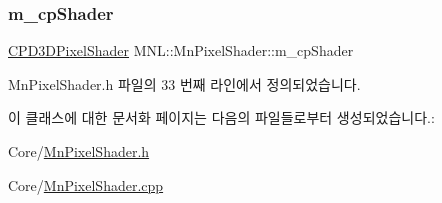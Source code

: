 \subsubsection{\texorpdfstring{m\+\_\+cp\+Shader}{m\_cpShader}}
{\footnotesize\ttfamily \hyperlink{namespace_m_n_l_a4d6bd408e6e19137a03728583296f12a}{C\+P\+D3\+D\+Pixel\+Shader} M\+N\+L\+::\+Mn\+Pixel\+Shader\+::m\+\_\+cp\+Shader\hspace{0.3cm}{\ttfamily [private]}}



Mn\+Pixel\+Shader.\+h 파일의 33 번째 라인에서 정의되었습니다.



이 클래스에 대한 문서화 페이지는 다음의 파일들로부터 생성되었습니다.\+:\begin{DoxyCompactItemize}
\item 
Core/\hyperlink{_mn_pixel_shader_8h}{Mn\+Pixel\+Shader.\+h}\item 
Core/\hyperlink{_mn_pixel_shader_8cpp}{Mn\+Pixel\+Shader.\+cpp}\end{DoxyCompactItemize}
